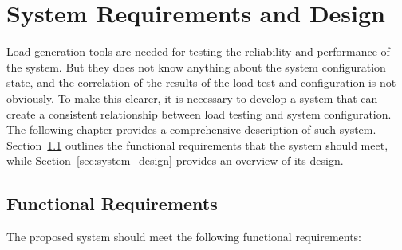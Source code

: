 \graphicspath{{figs/}} %


\chapter{System Requirements and Design}
\label{ch:design}

Load generation tools are needed for testing the reliability and performance of the system. But they does not know anything about the system configuration state, and the correlation of the results of the load test and configuration is not obviously. To make this clearer, it is necessary to develop a system that can create a consistent relationship between load testing and system configuration. The following chapter provides a comprehensive description of such system. Section~\ref{sec:functional-requirements} outlines the functional requirements that the system should meet, while Section~\ref{sec:system_design} provides an overview of its design.


\section{Functional Requirements}\label{sec:functional-requirements}
The proposed system should meet the following functional requirements:

